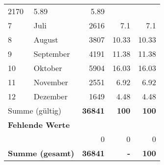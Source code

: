 \begin{longtable}{lXrrr}
       \num{2170} &
       \num[round-mode=places,round-precision=2]{5.89} &
         \num[round-mode=places,round-precision=2]{5.89} \\

     7 &
     \multicolumn{1}{X}{ Juli   } &


       \num{2616} &
       \num[round-mode=places,round-precision=2]{7.1} &
         \num[round-mode=places,round-precision=2]{7.1} \\

     8 &
     \multicolumn{1}{X}{ August   } &


       \num{3807} &
       \num[round-mode=places,round-precision=2]{10.33} &
         \num[round-mode=places,round-precision=2]{10.33} \\

     9 &
     \multicolumn{1}{X}{ September   } &


       \num{4191} &
       \num[round-mode=places,round-precision=2]{11.38} &
         \num[round-mode=places,round-precision=2]{11.38} \\

     10 &
     \multicolumn{1}{X}{ Oktober   } &


       \num{5904} &
       \num[round-mode=places,round-precision=2]{16.03} &
         \num[round-mode=places,round-precision=2]{16.03} \\

     11 &
     \multicolumn{1}{X}{ November   } &


       \num{2551} &
       \num[round-mode=places,round-precision=2]{6.92} &
         \num[round-mode=places,round-precision=2]{6.92} \\

     12 &
     \multicolumn{1}{X}{ Dezember   } &


       \num{1649} &
       \num[round-mode=places,round-precision=2]{4.48} &
         \num[round-mode=places,round-precision=2]{4.48} \\
     \midrule
     \multicolumn{2}{l}{Summe (gültig)} &
       \textbf{\num{36841}} &
     \textbf{\num{100}} &
       \textbf{\num[round-mode=places,round-precision=2]{100}} \\
     \multicolumn{5}{l}{\textbf{Fehlende Werte}}\\
      & & 0 & 0 & 0 \\
     \midrule
     \multicolumn{2}{l}{\textbf{Summe (gesamt)}} &
          \textbf{\num{36841}} &
        \textbf{-} &
        \textbf{\num{100}} \\
     \bottomrule
     \end{longtable}
     
